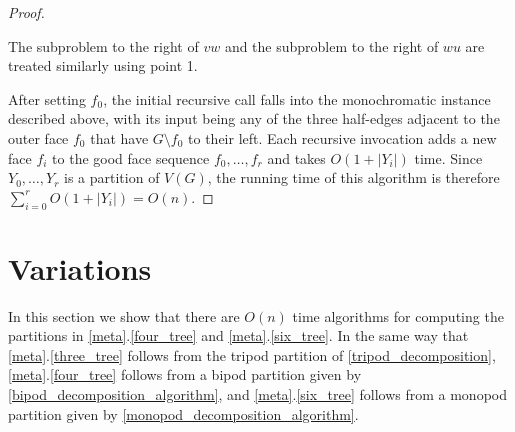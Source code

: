 \documentclass{patmorin}
\begin{document}
\begin{proof}
\begin{enumerate}
\end{enumerate}
The subproblem to the right of $vw$ and the subproblem to the right of $wu$ are treated similarly using point 1.

After setting $f_0$, the initial recursive call falls into the monochromatic instance described above, with its input being any of the three half-edges adjacent to the outer face $f_0$ that have $G \setminus f_0$ to their left.  Each recursive invocation adds a new face $f_i$ to the good face sequence $f_0,\ldots,f_{r}$ and takes $O(1+|Y_i|)$ time.  Since $Y_0,\ldots,Y_{r}$ is a partition of $V(G)$, the running time of this algorithm is therefore $\sum_{i=0}^{r} O(1+|Y_i|) = O(n)$.
\end{proof}


\section{Variations}
\label{variants}

In this section we show that there are $O(n)$ time algorithms for computing the partitions in \cref{meta}.\ref{four_tree} and \cref{meta}.\ref{six_tree}.  In the same way that \cref{meta}.\ref{three_tree} follows from the tripod partition of \cref{tripod_decomposition}, \cref{meta}.\ref{four_tree} follows from a bipod partition given by \cref{bipod_decomposition_algorithm}, and \cref{meta}.\ref{six_tree} follows from a monopod partition given by \cref{monopod_decomposition_algorithm}.

\end{document}
